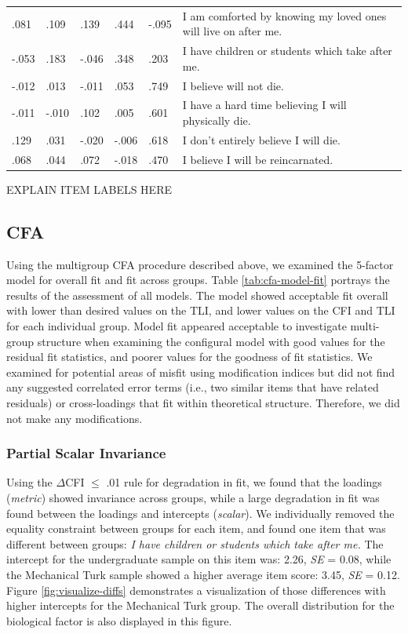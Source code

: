 \documentclass[
  english,
  man]{apa6}
\begin{document}
\begin{table}[!h]
{\begin{tabular}[t]{lllll>{\raggedright\arraybackslash}p{8cm}}
.081 & .109 & .139 & .444 & -.095 & I am comforted by knowing my loved ones
will live on after me.\\
-.053 & .183 & -.046 & .348 & .203 & I have children or students which take
after me.\\
-.012 & .013 & -.011 & .053 & .749 & I believe will not die.\\
-.011 & -.010 & .102 & .005 & .601 & I have a hard time believing I will
physically die.\\
\addlinespace
.129 & .031 & -.020 & -.006 & .618 & I don't entirely believe I will die.\\
.068 & .044 & .072 & -.018 & .470 & I believe I will be reincarnated.\\
\bottomrule
\end{tabular}}
\end{table}

EXPLAIN ITEM LABELS HERE

\subsection{CFA}\label{cfa}

Using the multigroup CFA procedure described above, we examined the
5-factor model for overall fit and fit across groups. Table
\ref{tab:cfa-model-fit} portrays the results of the assessment of all
models. The model showed acceptable fit overall with lower than desired
values on the TLI, and lower values on the CFI and TLI for each
individual group. Model fit appeared acceptable to investigate
multi-group structure when examining the configural model with good
values for the residual fit statistics, and poorer values for the
goodness of fit statistics. We examined for potential areas of misfit
using modification indices but did not find any suggested correlated
error terms (i.e., two similar items that have related residuals) or
cross-loadings that fit within theoretical structure. Therefore, we did
not make any modifications.

\subsubsection{Partial Scalar Invariance}\label{partial-scalar-invariance}

Using the \(\Delta\)CFI \(\le\) .01 rule for degradation in fit, we found
that the loadings (\emph{metric}) showed invariance across groups, while a
large degradation in fit was found between the loadings and intercepts
(\emph{scalar}). We individually removed the equality constraint between
groups for each item, and found one item that was different between
groups: \emph{I have children or students which take after me.} The intercept
for the undergraduate sample on this item was:
2.26,
\emph{SE} =
0.08,
while the Mechanical Turk sample showed a higher average item score:
3.45,
\emph{SE} =
0.12.
Figure \ref{fig:visualize-diffs} demonstrates a visualization of those
differences with higher intercepts for the Mechanical Turk group. The
overall distribution for the biological factor is also displayed in this
figure.
\end{document}
